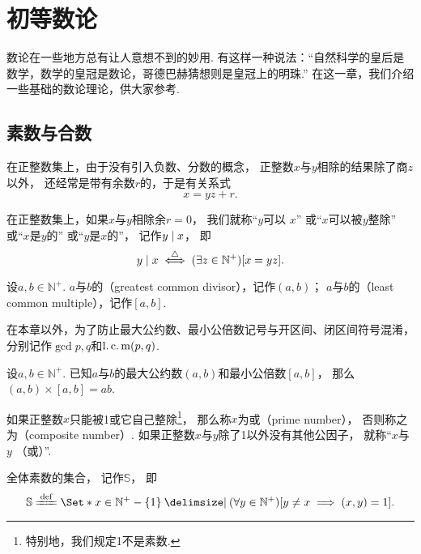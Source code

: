 \begingroup
\chapter{初等数论}
数论在一些地方总有让人意想不到的妙用.
有这样一种说法：“自然科学的皇后是数学，数学的皇冠是数论，哥德巴赫猜想则是皇冠上的明珠.”
在这一章，我们介绍一些基础的数论理论，供大家参考.

\section{素数与合数}
在正整数集上，由于没有引入负数、分数的概念，
正整数\(x\)与\(y\)相除的结果除了商\(z\)以外，
还经常是带有余数\(r\)的，于是有关系式\[
	x = y z + r.
\]

\begin{definition}
在正整数集上，如果\(x\)与\(y\)相除余\(r=0\)，
我们就称“\(y\)可以 \(x\)”
或“\(x\)可以被\(y\)整除”
或“\(x\)是\(y\)的”
或“\(y\)是\(x\)的”，
记作\(\truediv{x}{y}\)，
即\[
	\truediv{x}{y}
	\defiff
	(\exists z \in \mathbb{N}^+)
	[x = y z].
\]
\end{definition}

\begin{definition}
设\(a,b\in\mathbb{N}^+\).
\(a\)与\(b\)的（greatest common divisor），记作\((a,b)\)；
\(a\)与\(b\)的（least common multiple），记作\([a,b]\).
\end{definition}
在本章以外，为了防止最大公约数、最小公倍数记号与开区间、闭区间符号混淆，
分别记作\(\gcd{p,q}\)和\(\lcm{p,q}\).

\begin{theorem}
设\(a,b\in\mathbb{N}^+\).
已知\(a\)与\(b\)的最大公约数\((a,b)\)和最小公倍数\([a,b]\)，
那么\((a,b)\times[a,b]=ab\).
\end{theorem}

\begin{definition}
如果正整数\(x\)只能被1或它自己整除\footnote{特别地，我们规定1不是素数.}，
那么称\(x\)为或（prime number），
否则称之为（composite number）.
如果正整数\(x\)与\(y\)除了1以外没有其他公因子，
就称“\(x\)与\(y\) （或）”.

全体素数的集合，
记作\(\mathbb{S}\)，
即\[
	\mathbb{S}
	\defeq
	\Set*{
		x\in\mathbb{N}^+-\{1\}
		\given
		(\forall y\in\mathbb{N}^+)
		[y \neq x \implies (x,y)=1]
	}.
\]
\end{definition}

